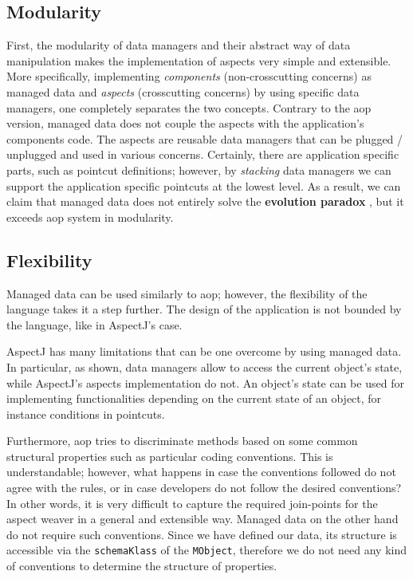 \subsection{Modularity}
First, the modularity of data managers and their abstract way of data manipulation makes the implementation of aspects very simple and extensible.
More specifically, implementing \textit{components} (non-crosscutting concerns) as managed data and \textit{aspects} (crosscutting concerns) by using specific data managers, one completely separates the two concepts.
Contrary to the \ac{aop} version, managed data does not couple the aspects with the application's components code.
The aspects are reusable data managers that can be plugged / unplugged and used in various concerns.
Certainly, there are application specific parts, such as pointcut definitions; however, by \textit{stacking} data managers we can support the application specific pointcuts at the lowest level.
As a result, we can claim that managed data does not entirely solve the \textbf{evolution paradox} \cite{tourwe2003existence}, but it exceeds \ac{aop} system in modularity.

\subsection{Flexibility}
Managed data can be used similarly to \ac{aop}; however, the flexibility of the language takes it a step further.
The design of the application is not bounded by the language, like in AspectJ's case.

AspectJ has many limitations that can be one overcome by using managed data.
In particular, as shown, data managers allow to access the current object's state, while AspectJ's aspects implementation do not.
An object's state can be used for implementing functionalities depending on the current state of an object, for instance conditions in pointcuts.

Furthermore, \ac{aop} tries to discriminate methods based on some common structural properties such as particular coding conventions. 
This is understandable; however, what happens in case the conventions followed do not agree with the rules, or in case developers do not follow the desired conventions?
In other words, it is very difficult to capture the required join-points for the aspect weaver in a general and extensible way.
Managed data on the other hand do not require such conventions.
Since we have defined our data, its structure is accessible via the \texttt{schemaKlass} of the \texttt{MObject}, therefore we do not need any kind of conventions to determine the structure of properties.

